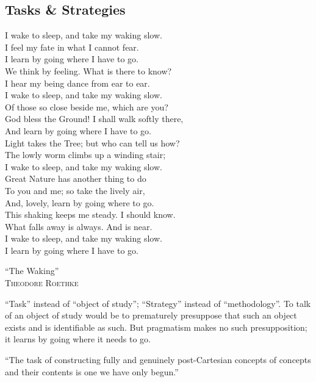 \documentclass[11pt,twoside]{article}
\begin{document}
\subsection{Tasks \& Strategies}

\epigraph{
I wake to sleep, and take my waking slow.\\
I feel my fate in what I cannot fear.\\
I learn by going where I have to go.\\
\vspace{4pt}
We think by feeling. What is there to know?\\
I hear my being dance from ear to ear.\\
I wake to sleep, and take my waking slow.\\
\vspace{4pt}
Of those so close beside me, which are you?\\
God bless the Ground!   I shall walk softly there,\\
And learn by going where I have to go.\\
\vspace{4pt}
Light takes the Tree; but who can tell us how?\\
The lowly worm climbs up a winding stair;\\
I wake to sleep, and take my waking slow.\\
\vspace{4pt}
Great Nature has another thing to do \\
To you and me; so take the lively air,\\
And, lovely, learn by going where to go.\\
\vspace{4pt}
This shaking keeps me steady. I should know. \\
What falls away is always. And is near. \\
I wake to sleep, and take my waking slow. \\
I learn by going where I have to go.}{``The Waking''\\
\textsc{Theodore Roethke}}

``Task'' instead of ``object of study''; ``Strategy'' instead of
``methodology''.  To talk of an object of study would be to
prematurely presuppose that such an object exists and is identifiable
as such.  But pragmatism makes no such presupposition; it learns by
going where it needs to go.

``The task of constructing fully and genuinely post-Cartesian concepts
of concepts and their contents is one we have only begun.'' \parencite[252]{brandom_descombes_2004}
\end{document}
